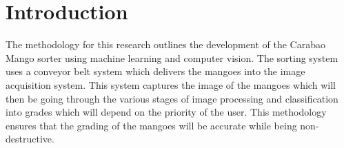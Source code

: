 

\section{Introduction}
The methodology for this research outlines the development of the Carabao Mango sorter using machine learning and computer vision. The sorting system uses a conveyor belt system which delivers the mangoes into the image acquisition system. This system captures the image of the mangoes which will then be going through the various stages of image processing and classification into grades which will depend on the priority of the user. This methodology ensures that the grading of the mangoes will be accurate while being non-destructive.


